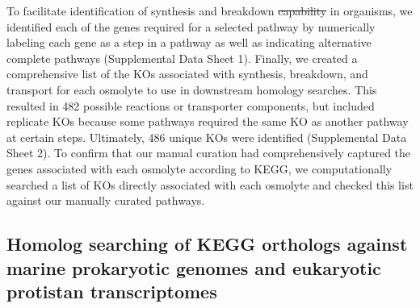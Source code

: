 \documentclass[utf8]{frontiersSCNS} %
\providecommand{\DIFaddtex}[1]{{\protect\color{blue}\uwave{#1}}} %
\providecommand{\DIFdeltex}[1]{{\protect\color{red}\sout{#1}}}                      %
\providecommand{\DIFaddbegin}{} %
\providecommand{\DIFaddend}{} %
\providecommand{\DIFdelbegin}{} %
\providecommand{\DIFdelend}{} %
\providecommand{\DIFadd}[1]{\texorpdfstring{\DIFaddtex{#1}}{#1}} %
\providecommand{\DIFdel}[1]{\texorpdfstring{\DIFdeltex{#1}}{}} %
\begin{document}
To facilitate identification of synthesis and breakdown \DIFdelbegin \DIFdel{capability }\DIFdelend \DIFaddbegin \DIFadd{capabilities }\DIFaddend in organisms, we identified each of the genes required for a selected pathway by numerically labeling each gene as a step in a pathway as well as indicating alternative complete pathways (Supplemental Data Sheet 1). Finally, we created a comprehensive list of the KOs associated with synthesis, breakdown, and transport for each osmolyte to use in downstream homology searches. This resulted in 482 possible reactions or transporter components, but included replicate KOs because some pathways required the same KO as another pathway at certain steps. Ultimately, 486 unique KOs were identified (Supplemental Data Sheet 2). To confirm that our manual curation had comprehensively captured the genes associated with each osmolyte according to KEGG, we computationally searched a list of KOs directly associated with each osmolyte and checked this list against our manually curated pathways.

\subsection{Homolog searching of KEGG orthologs against marine prokaryotic genomes and eukaryotic protistan transcriptomes}
\end{document}
